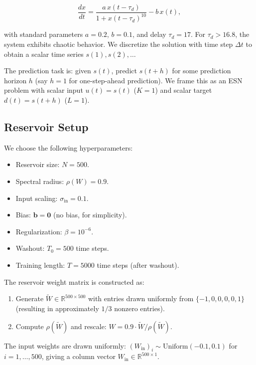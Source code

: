 \begin{equation}\label{eq:14.10}\tag{14.10}
\frac{dx}{dt} = \frac{a\, x(t - \tau_d)}{1 + x(t - \tau_d)^{10}} - b\, x(t),
\end{equation}

with standard parameters $a = 0.2$, $b = 0.1$, and delay $\tau_d = 17$. For $\tau_d > 16.8$, the system exhibits chaotic behavior. We discretize the solution with time step $\Delta t$ to obtain a scalar time series $s(1), s(2), \ldots$

The prediction task is: given $s(t)$, predict $s(t + h)$ for some prediction horizon $h$ (say $h = 1$ for one-step-ahead prediction). We frame this as an ESN problem with scalar input $u(t) = s(t)$ ($K = 1$) and scalar target $d(t) = s(t + h)$ ($L = 1$).

\subsection{Reservoir Setup}\label{sec:14.6.2}

We choose the following hyperparameters:

\begin{itemize}[nosep]
  \item Reservoir size: $N = 500$.
  \item Spectral radius: $\rho(W) = 0.9$.
  \item Input scaling: $\sigma_{\text{in}} = 0.1$.
  \item Bias: $\mathbf{b} = \mathbf{0}$ (no bias, for simplicity).
  \item Regularization: $\beta = 10^{-6}$.
  \item Washout: $T_0 = 500$ time steps.
  \item Training length: $T = 5000$ time steps (after washout).
\end{itemize}

The reservoir weight matrix is constructed as:

\begin{enumerate}[nosep]
  \item Generate $\widetilde{W} \in \mathbb{R}^{500 \times 500}$ with entries drawn uniformly from $\{-1, 0, 0, 0, 0, 1\}$ (resulting in approximately $1/3$ nonzero entries).
  \item Compute $\rho(\widetilde{W})$ and rescale: $W = 0.9 \cdot \widetilde{W} / \rho(\widetilde{W})$.
\end{enumerate}

The input weights are drawn uniformly: $(W_{\text{in}})_i \sim \text{Uniform}(-0.1, 0.1)$ for $i = 1, \ldots, 500$, giving a column vector $W_{\text{in}} \in \mathbb{R}^{500 \times 1}$.

